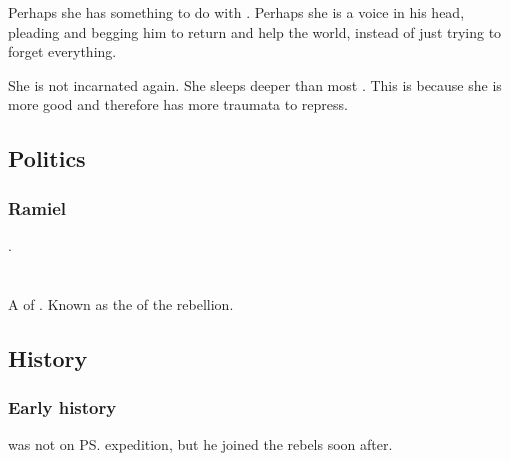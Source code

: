 Perhaps she has something to do with \Sithiyacaan. 
Perhaps she is a voice in his head, pleading and begging him to return and help the world, instead of just trying to forget everything. 

She is not incarnated again. 
She sleeps deeper than most \malachim. 
This is because she is more good and therefore has more traumata to repress. 









\subsection{Politics}





\subsubsection{Ramiel}
. 















\section{\Kezrabal}
\index{\Kezrabal} 
A \resphan{} of \Merkyrah.
Known as the  of the \Merkyran{} rebellion. 









\subsection{History}
\subsubsection{Early history}
\Kezrabal{} was not on \ps{\Damiarch} expedition, but he joined the rebels soon after. 





